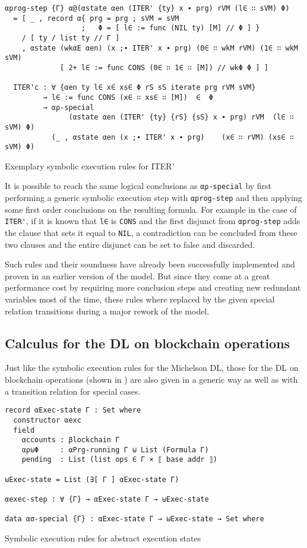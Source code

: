 \begin{listing}[!ht]
\begin{verbatim}
αprog-step {Γ} α@(αstate αen (ITER' {ty} x ∙ prg) rVM (l∈ ∷ sVM) Φ)
  = [ _ , record α{ prg = prg ; sVM = sVM 
                  ;   Φ = [ l∈ := func (NIL ty) [M] // Φ ] }
    / [ ty / list ty // Γ ]
    , αstate (wkαE αen) (x ;∙ ITER' x ∙ prg) (0∈ ∷ wkM rVM) (1∈ ∷ wkM sVM)
             [ 2+ l∈ := func CONS (0∈ ∷ 1∈ ∷ [M]) // wkΦ Φ ] ]

  ITER'c : ∀ {αen ty l∈ x∈ xs∈ Φ rS sS iterate prg rVM sVM}
         → l∈ := func CONS (x∈ ∷ xs∈ ∷ [M])  ∈  Φ
         → αρ-special
               (αstate αen (ITER' {ty} {rS} {sS} x ∙ prg) rVM  (l∈ ∷ sVM) Φ)
           (_ , αstate αen (x ;∙ ITER' x ∙ prg)    (x∈ ∷ rVM) (xs∈ ∷ sVM) Φ)
\end{verbatim}
\caption{Exemplary symbolic execution rules for ITER'}
\label{a-ITER'}
\end{listing}

It is possible to reach the same logical conclusions as \verb/αρ-special/
by first performing a generic symbolic execution step with \verb/αprog-step/
and then applying some first order conclusions on the resulting formula.
For example in the case of \verb/ITER'/,
if it is known that \verb/l∈/ is \verb/CONS/
and the first disjunct from \verb/αprog-step/ adds the clause that sets it equal to \verb/NIL/,
a contradiction can be concluded from these two clauses and the entire disjunct
can be set to false and discarded.

Such rules and their soundness have already been successfully implemented and proven
in an earlier version of the model.
But since they come at a great performance cost by requiring more conclusion steps
and creating new redundant variables most of the time,
these rules where replaced by the given special relation transitions
during a major rework of the model.

\subsection{Calculus for the DL on blockchain operations}

Just like the symbolic execution rules for the Michelson DL,
those for the DL on blockchain operations (shown in )
are also given in a generic way as well as with a transition relation for special cases.

\begin{listing}[!ht]
\begin{verbatim}
record αExec-state Γ : Set where
  constructor αexc
  field
    αccounts : βlockchain Γ
    αρ⊎Φ     : αPrg-running Γ ⊎ List (Formula Γ)
    pending  : List (list ops ∈ Γ × ⟦ base addr ⟧)

⊎Exec-state = List (∃[ Γ ] αExec-state Γ)

αexec-step : ∀ {Γ} → αExec-state Γ → ⊎Exec-state

data ασ-special {Γ} : αExec-state Γ → ⊎Exec-state → Set where
\end{verbatim}
\caption{Symbolic execution rules for abstract execution states}
\label{aexec-all}
\end{listing}

